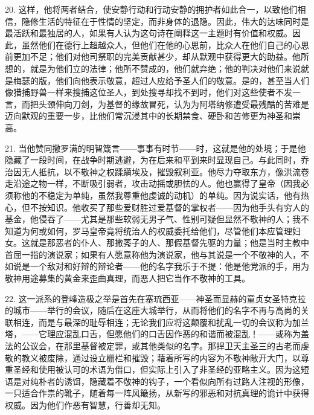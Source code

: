 20. 这样，他将两者结合，使安静行动和行动安静的拥护者如此合一，以致他们相信，隐修生活的特征在于性情的坚定，而非身体的退隐。因此，伟大的达味同时是最活跃和最独居的人，如果有人认为这句诗在阐释这一主题时有价值和权威。因此，虽然他们在德行上超越众人，但他们在他的心思前，比众人在他们自己的心思前更加不足；他们对他司祭职的完美贡献甚少，却从默观中获得更大的助益。他所想的，就是为他们立的法律；他所不赞成的，他们就弃绝；他的判决对他们来说就是梅瑟的版，他们向他表示敬意，超过人应给予圣人们的敬意。是的，甚至当人们像猎捕野兽一样来搜捕这位圣人，到处搜寻却找不到时，他们对这些使者不发一言，而把头颈伸向刀剑，为基督的缘故冒死，认为为阿塔纳修遭受最残酷的苦难是迈向默观的重要一步，比他们常沉浸其中的长期禁食、硬卧和苦修更为神圣和崇高。\par

21. 当他赞同撒罗满的明智箴言——事事有时节——时，这就是他的处境；于是他隐藏了一段时间，在战争时期逃避，为在后来和平到来时显现自己。与此同时，乔治因无人抵抗，以不敬神之权蹂躏埃及，摧毁叙利亚。他尽力夺取东方，像洪流卷走沿途之物一样，不断吸引弱者，攻击动摇或胆怯的人。他也赢得了皇帝（因我必须称他的不稳定为单纯，虽然我尊重他虔诚的动机）的单纯。因为说实话，他有热心，但不按知识。他收买了那些爱财胜过爱基督的掌权者——因为他手头有穷人的基金，他侵吞了——尤其是那些软弱无男子气、性别可疑但显然不敬神的人；我不知道为何或如何，罗马皇帝竟将统治人的权威委托给他们，尽管他们本应管理妇女。这就是那恶者的仆人、那撒莠子的人、那假基督先驱的力量；他是当时主教中首屈一指的演说家；如果有人愿意称他为演说家，他与其说是一个不敬神的人，不如说是一个敌对和好辩的辩论者——他的名字我乐于不提：他是他党派的手，用为敬神用途募集的黄金来歪曲真理，而恶人把它当作不敬神的工具。\par

22. 这一派系的登峰造极之举是首先在塞琉西亚——神圣而显赫的童贞女圣特克拉的城市——举行的会议，随后在这座大城举行，从而将他们的名字不再与高尚的关联相连，而是与最深的耻辱相连；无论我们应将这颠覆和扰乱一切的会议称为加兰塔，——它理应混乱口舌，但愿他们的口舌因作恶的和谐而被混乱！——或称为盖法的公议会，在那里基督被定罪，或其他类似的名字。那捍卫天主圣三的古老而虔敬的教义被废除，通过设立栅栏和摧毁；藉着所写的内容为不敬神敞开大门，以尊重圣经和使用被认可的术语为借口，但实际上引入了非圣经的亚略主义。因为这短语是对纯朴者的诱饵，隐藏着不敬神的钩子，一个看似向所有过路人注视的形像，一只适合作祟的靴子，随着每一阵风簸扬，从新写的邪恶和对抗真理的诡计中获得权威。因为他们作恶有智慧，行善却无知。\par

